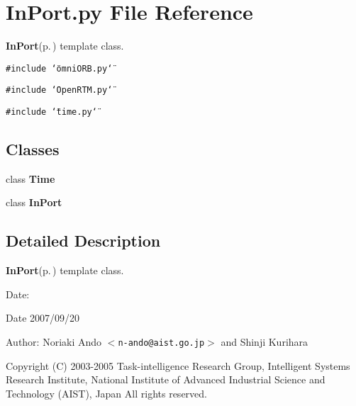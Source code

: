 \section{In\-Port.py File Reference}
\label{InPort_8py}
{\bf In\-Port}{\rm (p.\,\pageref{classInPort})} template class. 

{\tt \#include \char`\"{}omni\-ORB.py\char`\"{}}\par
{\tt \#include \char`\"{}Open\-RTM.py\char`\"{}}\par
{\tt \#include \char`\"{}time.py\char`\"{}}\par
\subsection*{Classes}
\begin{CompactItemize}
\item 
class {\bf Time}
\item 
class {\bf In\-Port}
\end{CompactItemize}


\subsection{Detailed Description}
{\bf In\-Port}{\rm (p.\,\pageref{classInPort})} template class. 

\begin{Desc}
\item[Date:]\begin{Desc}
\item[Date]2007/09/20 \end{Desc}
\end{Desc}
\begin{Desc}
\item[Author:]Noriaki Ando $<${\tt n-ando@aist.go.jp}$>$ and Shinji Kurihara\end{Desc}
Copyright (C) 2003-2005 Task-intelligence Research Group, Intelligent Systems Research Institute, National Institute of Advanced Industrial Science and Technology (AIST), Japan All rights reserved.